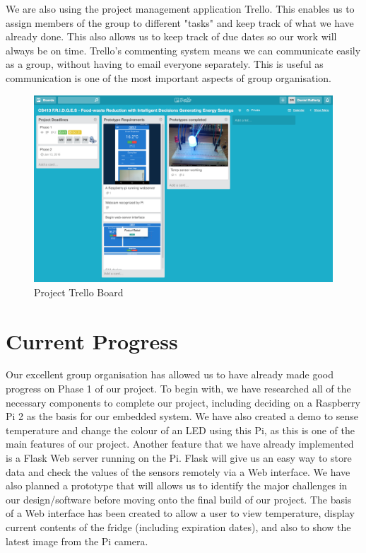 \documentclass[10pt]{article}
\begin{document}
{{We are also using the project management application Trello. This enables us to assign members of the group to different "tasks" and keep track of what we have already done. This also allows us to keep track of due dates so our work will always be on time. Trello's commenting system means we can communicate easily as a group, without having to email everyone separately. This is useful as communication is one of the most important aspects of group organisation.
\begin{figure}[h]
\centering
\caption{Project Trello Board}
\label{Project Trello Board}
\includegraphics[height=7cm]{images/Trello-screenshot.png}
\end{figure}

\section{Current Progress}

Our excellent group organisation has allowed us to have already made good progress on Phase 1 of our project. To begin with, we have researched all of the necessary components to complete our project, including deciding on a Raspberry Pi 2 as the basis for our embedded system. We have also created a demo to sense temperature and change the colour of an LED using this Pi, as this is one of the main features of our project. Another feature that we have already implemented is a Flask Web server running on the Pi. Flask will give us an easy way to store data and check the values of the sensors remotely via a Web interface. We have also planned a prototype that will allows us to identify the major challenges in our design/software before moving onto the final build of our project. The basis of a Web interface has been created to allow a user to view temperature, display current contents of the fridge (including expiration dates), and also to show the latest image from the Pi camera.

}}
\end{document}
